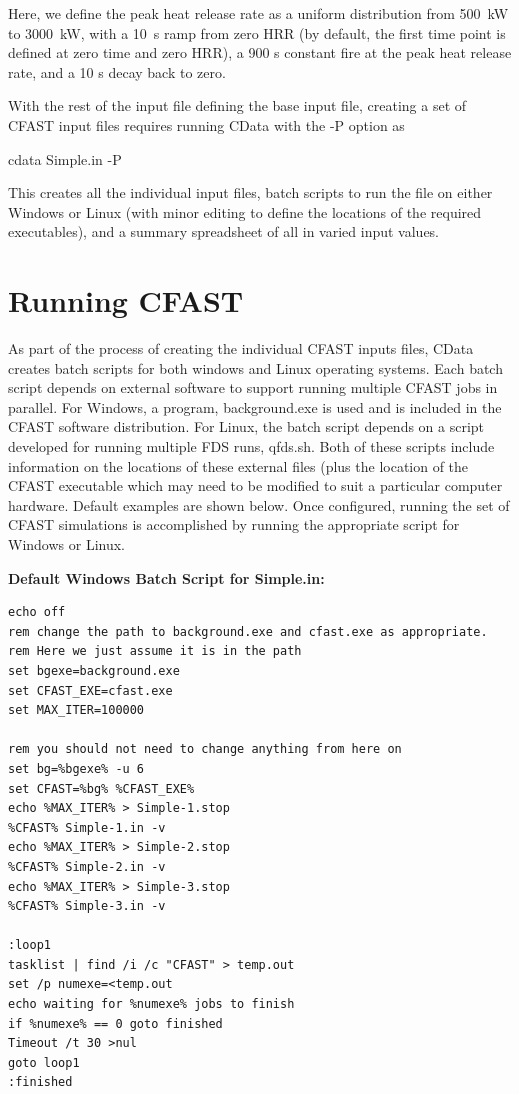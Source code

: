 \documentclass[12pt,twoside]{book}
\begin{document}
Here, we define the peak heat release rate as a uniform distribution from 500~kW to 3000~kW, with a 10~s ramp from zero HRR (by default, the first time point is defined at zero time and zero HRR), a 900 s constant fire at the peak heat release rate, and a 10 s decay back to zero.

With the rest of the input file defining the base input file, creating a set of CFAST input files requires running CData with the {\ct -P} option as

{\ct cdata Simple.in -P}

This creates all the individual input files, batch scripts to run the file on either Windows or Linux (with minor editing to define the locations of the required executables), and a summary spreadsheet of all in varied input values.

\section{Running CFAST}

As part of the process of creating the individual CFAST inputs files, CData creates batch scripts for both windows and Linux operating systems. Each batch script depends on external software to support running multiple CFAST jobs in parallel. For Windows, a program, {\ct background.exe} is used and is included in the CFAST software distribution. For Linux, the batch script depends on a script developed for running multiple FDS runs, {\ct qfds.sh}. Both of these scripts include information on the locations of these external files (plus the location of the CFAST executable which may need to be modified to suit a particular computer hardware. Default examples are shown below. Once configured, running the set of CFAST simulations is accomplished by running the appropriate script for Windows or Linux.

\vspace{\baselineskip}
\noindent \textbf{Default Windows Batch Script for Simple.in:}

\begin{lstlisting}[basicstyle=\scriptsize]
echo off
rem change the path to background.exe and cfast.exe as appropriate.
rem Here we just assume it is in the path
set bgexe=background.exe
set CFAST_EXE=cfast.exe
set MAX_ITER=100000

rem you should not need to change anything from here on
set bg=%bgexe% -u 6
set CFAST=%bg% %CFAST_EXE%
echo %MAX_ITER% > Simple-1.stop
%CFAST% Simple-1.in -v
echo %MAX_ITER% > Simple-2.stop
%CFAST% Simple-2.in -v
echo %MAX_ITER% > Simple-3.stop
%CFAST% Simple-3.in -v

:loop1
tasklist | find /i /c "CFAST" > temp.out
set /p numexe=<temp.out
echo waiting for %numexe% jobs to finish
if %numexe% == 0 goto finished
Timeout /t 30 >nul
goto loop1
:finished
\end{lstlisting}
\end{document}
